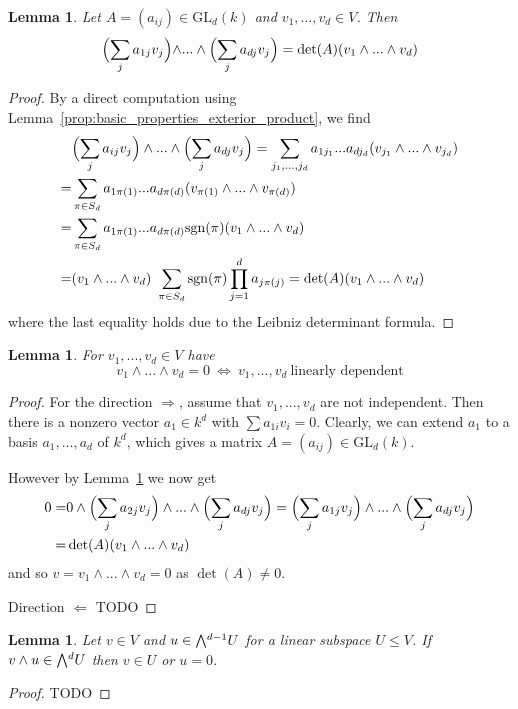 \documentclass{scrartcl}
\newcommand{\GL}{\mathrm{GL}}
\newcommand{\sgn}{\mathrm{sgn}}
\newcommand{\extpow}{\mathchoice{{\textstyle\bigwedge}}
    {{\bigwedge}}
    {{\textstyle\wedge}}
    {{\scriptstyle\wedge}}}
\newtheorem{lemma}[definition]{Lemma}
\begin{document}
\begin{lemma}
    \label{prop:linear_transform_extpow}
    Let $A = (a_{ij}) \in \GL_d(k)$ and $v_1, ..., v_d \in V$.
    Then
    \begin{equation*}
        \Bigl( \sum_j a_{1j}v_j \Bigl) \wedge ... \wedge \Bigl( \sum_{j} a_{dj} v_j \Bigr) = \det(A) (v_1 \wedge ... \wedge v_d)
    \end{equation*}
\end{lemma}
\begin{proof}
    By a direct computation using Lemma~\ref{prop:basic_properties_exterior_product}, we find
    \begin{align*}
        &\Bigl( \sum_j a_{ij} v_j \Bigr) \wedge ... \wedge \Bigl( \sum_j a_{dj} v_j \Bigr) = \sum_{j_1, ..., j_d} a_{1j_1} ... a_{dj_d} (v_{j_1} \wedge ... \wedge v_{j_d}) \\
        = &\sum_{\pi \in S_d} a_{1\pi(1)} ... a_{d\pi(d)} (v_{\pi(1)} \wedge ... \wedge v_{\pi(d)}) \\
        = &\sum_{\pi \in S_d} a_{1\pi(1)} ... a_{d\pi(d)} \sgn(\pi) (v_1 \wedge ... \wedge v_d) \\
        = &(v_1 \wedge ... \wedge v_d) \ \sum_{\pi \in S_d} \sgn(\pi) \prod_{j = 1}^d a_{j\pi(j)} = \det(A) (v_1 \wedge ... \wedge v_d)
    \end{align*}
    where the last equality holds due to the Leibniz determinant formula.
\end{proof}
\begin{lemma}
    \label{prop:extpow_zero_iff_independent}
    For $v_1, ..., v_d \in V$ have
    \begin{equation*}
        v_1 \wedge ... \wedge v_d = 0 \ \Leftrightarrow \ v_1, ..., v_d \ \text{linearly dependent}
    \end{equation*}
\end{lemma}
\begin{proof}
    For the direction $\Rightarrow$, assume that $v_1, ..., v_d$ are not independent. 
    Then there is a nonzero vector $a_1 \in k^d$ with $\sum a_{1i} v_i = 0$.
    Clearly, we can extend $a_1$ to a basis $a_1, ..., a_d$ of $k^d$, which gives a matrix $A = (a_{ij}) \in \GL_d(k)$.

    However by Lemma~\ref{prop:linear_transform_extpow} we now get
    \begin{align*}
        0 =& 0 \wedge \Bigl( \sum_j a_{2j} v_j \Bigr) \wedge ... \wedge \Bigl( \sum_j a_{dj} v_j \Bigr) = \Bigl( \sum_j a_{1j} v_j \Bigr) \wedge ... \wedge \Bigl( \sum_j a_{dj} v_j \Bigr) \\
        =& \det(A) (v_1 \wedge ... \wedge v_d)
    \end{align*}
    and so $v = v_1 \wedge ... \wedge v_d = 0$ as $\det(A) \neq 0$.

    Direction $\Leftarrow$ TODO
\end{proof}
\begin{lemma}
    \label{prop:subspace_closed}
    Let $v \in V$ and $u \in \extpow^{d - 1} U$ for a linear subspace $U \leq V$. 
    If $v \wedge u \in \extpow^d U$ then $v \in U$ or $u = 0$.
\end{lemma}
\begin{proof}
    TODO
\end{proof}
\end{document}

